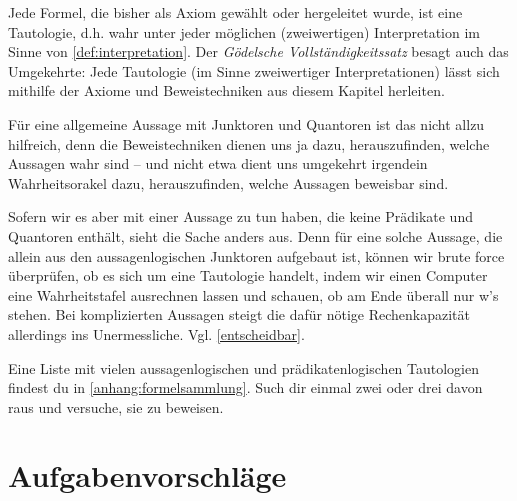 \begin{vorschau}
    Jede Formel, die bisher als Axiom gewählt oder hergeleitet wurde, ist eine Tautologie, d.h. wahr unter jeder möglichen (zweiwertigen) Interpretation im Sinne von \cref{def:interpretation}. Der \emph{Gödelsche Vollständigkeitssatz} besagt auch das Umgekehrte: Jede Tautologie (im Sinne zweiwertiger Interpretationen) lässt sich mithilfe der Axiome und Beweistechniken aus diesem Kapitel herleiten.
    
    Für eine allgemeine Aussage mit Junktoren und Quantoren ist das nicht allzu hilfreich, denn die Beweistechniken dienen uns ja dazu, herauszufinden, welche Aussagen wahr sind -- und nicht etwa dient uns umgekehrt irgendein Wahrheitsorakel dazu, herauszufinden, welche Aussagen beweisbar sind.
    
    Sofern wir es aber mit einer Aussage zu tun haben, die keine Prädikate und Quantoren enthält, sieht die Sache anders aus. Denn für eine solche Aussage, die allein aus den aussagenlogischen Junktoren aufgebaut ist, können wir brute force überprüfen, ob es sich um eine Tautologie handelt, indem wir einen Computer eine Wahrheitstafel ausrechnen lassen und schauen, ob am Ende überall nur w's stehen. Bei komplizierten Aussagen steigt die dafür nötige Rechenkapazität allerdings ins Unermessliche. Vgl. \cref{entscheidbar}.
\end{vorschau}


\begin{bem}
    Eine Liste mit vielen aussagenlogischen und prädikatenlogischen Tautologien findest du in \cref{anhang:formelsammlung}. Such dir einmal zwei oder drei davon raus und versuche, sie zu beweisen.
\end{bem}





\clearpage
\section{Aufgabenvorschläge}


